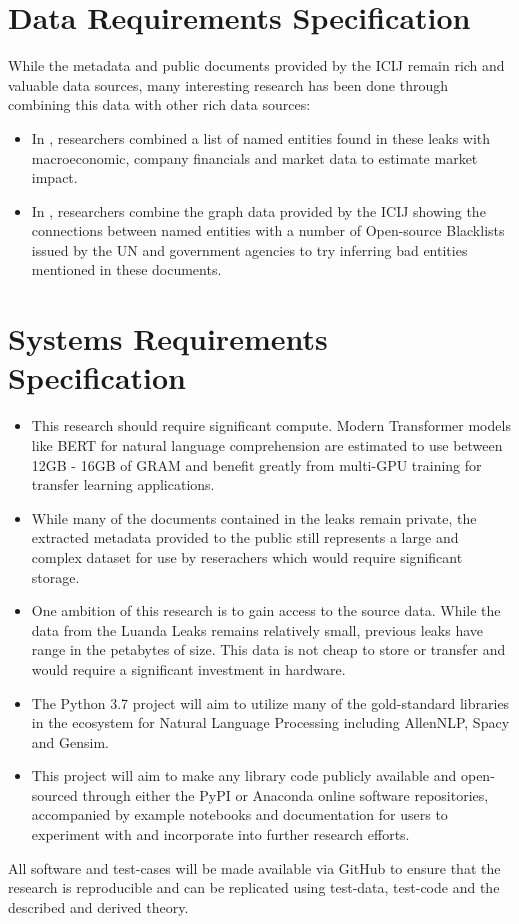 \documentclass[a4paper,latin]{paper}
\begin{document}
\section{Data Requirements Specification}
While the metadata and public documents provided by the ICIJ remain rich and valuable data sources, many interesting research has been done through combining this data with other rich data sources:  
\begin{itemize}
\item In \cite{ODonovan2019}, researchers combined a list of named entities found in these leaks with macroeconomic, company financials and market data to estimate market impact. 
\item In \cite{Joaristi2018}, researchers combine the graph data provided by the ICIJ showing the connections between named entities with a number of Open-source Blacklists issued by the UN and government agencies to try inferring bad entities mentioned in these documents.
\end{itemize}
  
\section{Systems Requirements Specification}
\begin{itemize}
\item This research should require significant compute. Modern Transformer models like BERT for natural language comprehension are estimated to use between 12GB - 16GB of GRAM and benefit greatly from multi-GPU training for transfer learning applications.  
\item While many of the documents contained in the leaks remain private, the extracted metadata provided to the public still represents a large and complex dataset for use by reserachers which would require significant storage.  
\item One ambition of this research is to gain access to the source data. While the data from the Luanda Leaks remains relatively small, previous leaks have range in the petabytes of size. This data is not cheap to store or transfer and would require a significant investment in hardware.  
\item The Python 3.7 project will aim to utilize many of the gold-standard libraries in the ecosystem for Natural Language Processing including AllenNLP, Spacy and Gensim.  
\item This project will aim to make any library code publicly available and open-sourced through either the PyPI or Anaconda online software repositories, accompanied by example notebooks and documentation for users to experiment with and incorporate into further research efforts.  
\end{itemize}
All software and test-cases will be made available via GitHub to ensure that the research is reproducible and can be replicated using test-data, test-code and the described and derived theory. 
\end{document}
